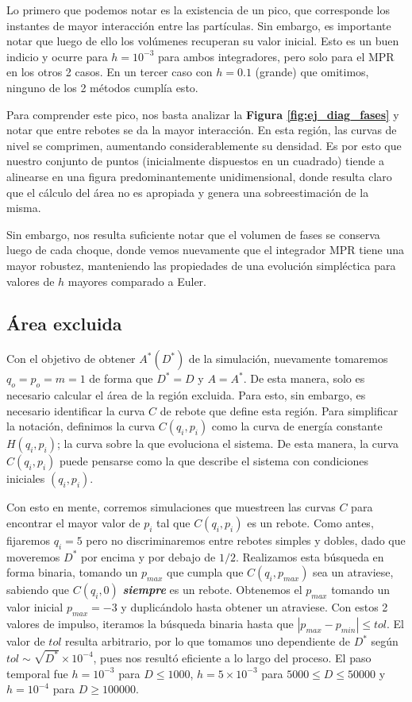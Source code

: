 Lo primero que podemos notar es la existencia de un pico, que corresponde los instantes de mayor interacción entre las partículas.
Sin embargo, es importante notar que luego de ello los volúmenes recuperan su valor inicial.
Esto es un buen indicio y ocurre para $h=10^{-3}$ para ambos integradores, pero solo para el MPR en los otros 2 casos.
En un tercer caso con $h=0.1$ (grande) que omitimos, ninguno de los 2 métodos cumplía esto.

Para comprender este pico, nos basta analizar la \textbf{Figura \ref{fig:ej_diag_fases}} y notar que entre rebotes se da la mayor interacción.
En esta región, las curvas de nivel se comprimen, aumentando considerablemente su densidad.
Es por esto que nuestro conjunto de puntos (inicialmente dispuestos en un cuadrado) tiende a alinearse en una figura predominantemente unidimensional, donde resulta claro que el cálculo del área
no es apropiada y genera una sobreestimación de la misma.

Sin embargo, nos resulta suficiente notar que el volumen de fases se conserva luego de cada choque, donde vemos nuevamente que el integrador MPR tiene una mayor robustez,
manteniendo las propiedades de una evolución simpléctica para valores de $h$ mayores comparado a Euler.


\subsection{Área excluida}{\label{sec:area_ex_comp}}

Con el objetivo de obtener $A^*(D^*)$ de la simulación, nuevamente tomaremos $q_o = p_o = m = 1$ de forma que $D^* = D$ y $A=A^*$.
De esta manera, solo es necesario calcular el área de la región excluida.
Para esto, sin embargo, es necesario identificar la curva $C$ de rebote que define esta región.
Para simplificar la notación, definimos la curva $C(q_i,p_i)$ como la curva de energía constante $H(q_i,p_i)$; la curva sobre la que evoluciona el sistema.
De esta manera, la curva $C(q_i,p_i)$ puede pensarse como la que describe el sistema con condiciones iniciales $(q_i,p_i)$.

Con esto en mente, corremos simulaciones que muestreen las curvas $C$ para encontrar el mayor valor de $p_i$ tal que $C(q_i, p_i)$ es un rebote.
Como antes, fijaremos $q_i=5$ pero no discriminaremos entre rebotes simples y dobles, dado que moveremos $D^*$ por encima y por debajo de $1/2$.
Realizamos esta búsqueda en forma binaria, tomando un $p_{max}$ que cumpla que $C(q_i, p_{max})$ sea un atraviese, sabiendo que $C(q_i, 0)$ \textbf{\textit{siempre}} es un rebote.
Obtenemos el $p_{max}$ tomando un valor inicial $p_{max} = -3$ y duplicándolo hasta obtener un atraviese.
Con estos 2 valores de impulso, iteramos la búsqueda binaria hasta que $|p_{max}-p_{min}|\leq tol$.
El valor de $tol$ resulta arbitrario, por lo que tomamos uno dependiente de $D^*$ según $tol \sim \sqrt{D^*}\times 10^{-4}$, pues nos resultó eficiente a lo largo del proceso.
El paso temporal fue $h=10^{-3}$ para $D\leq 1000$, $h=5\times10^{-3}$ para $5000\leq D\leq 50000$ y $h=10^{-4}$ para $D\geq 100000$.

